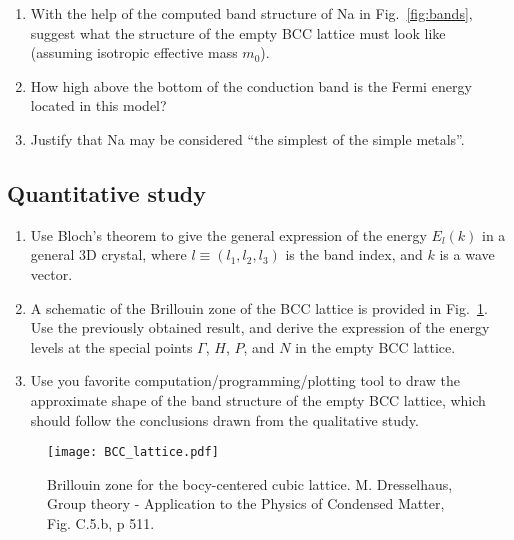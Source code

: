 \begin{enumerate}[label=(\roman*)]
\item With the help of the computed band structure of Na in Fig.~\ref{fig:bands}, suggest what the structure of the empty BCC lattice must look
  like (assuming isotropic effective mass $m_0$).
\item How high above the bottom of the conduction band is the Fermi
  energy located in this model?
\item Justify that Na may be considered ``the simplest of the simple metals''.
\end{enumerate}

\subsection{Quantitative study}

\begin{enumerate}[label=(\roman*)]
\item Use Bloch's theorem to give the general expression of the energy
  $E_l(k)$ in a general 3D crystal, where $l \equiv (l_1,l_2,l_3)$ is
  the band index, and $k$ is a wave vector.
\item A schematic of the Brillouin zone of the
  BCC lattice is provided in Fig.~\ref{fig:lattice}. Use the previously
  obtained result, and derive the expression of the energy levels at
  the special points $\Gamma$, $H$, $P$, and  $N$ in the empty BCC lattice.
\item Use you favorite computation/programming/plotting tool to
  draw the approximate shape of the band structure of the empty BCC
  lattice, which should follow the conclusions drawn from the
  qualitative study.
\end{enumerate}

\begin{figure}[h]
  \centering
  \texttt{[image: BCC\_lattice.pdf]}
  \caption{Brillouin zone for the bocy-centered cubic
    lattice. M. Dresselhaus, Group theory - Application to the
    Physics of Condensed Matter, Fig. C.5.b, p 511. \label{fig:lattice}}
\end{figure}



